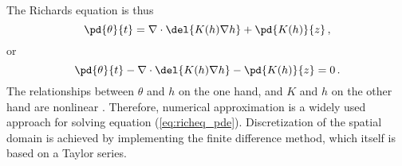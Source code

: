 The Richards equation is thus
\begin{equation}
  \label{eq:richeq_simple}
  \pd{\theta}{t} = \nabla \cdot \del{ K(h) \nabla h } + \pd{K(h)}{z} \, ,
\end{equation}
or
\begin{equation}
  \label{eq:richeq_pde}
  \pd{\theta}{t} - \nabla \cdot \del{ K(h) \nabla h } - \pd{K(h)}{z} = 0 \, .
\end{equation}
The relationships between $\theta$ and $h$ on the one hand, and $K$ and $h$ on the other hand are nonlinear \parencite{celia_general_1990}.  Therefore, numerical approximation is a widely used approach for solving equation (\ref{eq:richeq_pde}).  Discretization of the spatial domain is achieved by implementing the finite difference method, which itself is based on a Taylor series.

